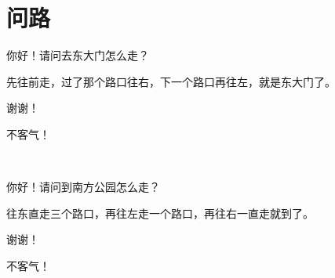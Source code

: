 \documentclass[12pt,UTF-8,openany]{ctexbook}
\begin{document}
\hanzibox{}\hanzibox{}\hanzibox{}\hanzibox{}\hspace{1em}\hanzibox{}\hanzibox{}\hanzibox{}\hanzibox{}

\hanzibox{}\hanzibox{}\hanzibox{}\hanzibox{}\hspace{1em}




\chapter{问路}

\begin{large}
    
    \begin{description}[itemsep=1ex,leftmargin=2.5em,labelwidth=2em]
    
    \item[{\color{script-1-1} 路人}]你好！请问去东大门怎么走？
    
    \item[{\color{script-1-0} 我}]先往前走，过了那个路口往右，下一个路口再往左，就是东大门了。
    
    \item[{\color{script-1-1} 路人}]谢谢！
    
    \item[{\color{script-1-0} 我}]不客气！
    
    \noindent ~
    
    \item[{\color{script-1-1} 路人}]你好！请问到南方公园怎么走？
    
    \item[{\color{script-1-0} 我}]往东直走三个路口，再往左走一个路口，再往右一直走就到了。
    
    \item[{\color{script-1-1} 路人}]谢谢！
    
    \item[{\color{script-1-0} 我}]不客气！
    
    \end{description}
    
    
\end{large}


\clearpage

\begin{center}
    
    
    
\end{center}
\end{document}
